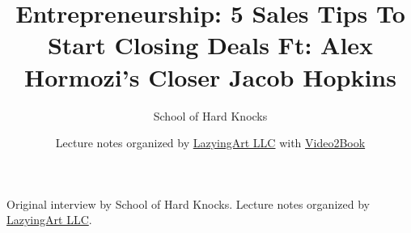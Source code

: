 \documentclass[11pt,oneside]{book}
\begin{document}
\frontmatter
\title{Entrepreneurship: 5 Sales Tips To Start Closing Deals Ft: Alex Hormozi's Closer Jacob Hopkins}
\author{School of Hard Knocks}
\date{Lecture notes organized by \href{https://lazying.art}{LazyingArt LLC} with \href{https://github.com/lachlanchen/Video2Book}{Video2Book}}
\maketitle
\begin{center}
\small Original interview by School of Hard Knocks. Lecture notes organized by \href{https://lazying.art}{LazyingArt LLC}.
\end{center}
\clearpage
\mainmatter

\end{document}
